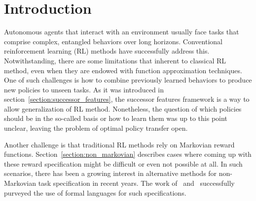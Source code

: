 \section{Introduction}

Autonomous agents that interact with an environment usually face tasks that comprise complex, entangled behaviors over long horizons. Conventional reinforcement learning (RL) methods have successfully address this. Notwithstanding, there are some limitations that inherent to classical RL method, even when they are endowed with function approximation techniques. One of such challenges is how to combine previously learned behaviors to produce new policies to unseen tasks. As it was introduced in section~\ref{section:successor_features}, the successor features framework is a way to allow generalization of RL method. Nonetheless, the question of which policies should be in the so-called basis or how to learn them was up to this point unclear, leaving the problem of optimal policy transfer open.

Another challenge is that traditional RL methods rely on Markovian reward functions. Section~\ref{section:non_markovian} describes cases where coming up with these reward specification might be difficult or even not possible at all. In such scenarios, there has been a growing interest in alternative methods for non-Markovian task specification in recent years. The work of~\citet{Camacho2019} and~\citet{Icarte2022} successfully purveyed the use of formal languages for such specifications. 

